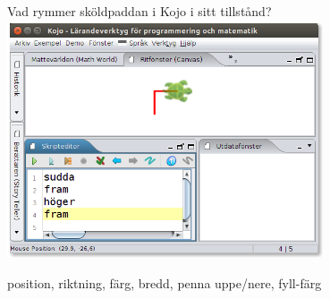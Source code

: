 \begin{Slide}{Vad rymmer sköldpaddan i Kojo i sitt tillstånd?}
\centering
\includegraphics[width=0.7\textwidth]{../img/kojo}

\pause position, riktning, färg, bredd, penna uppe/nere, fyll-färg
\end{Slide}



